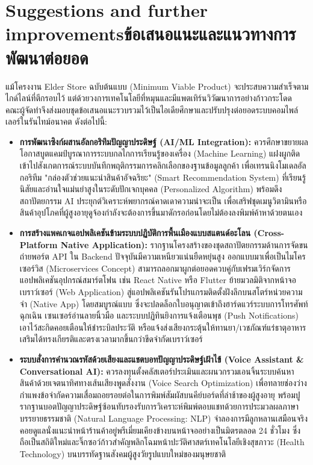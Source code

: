 \section{\ifenglish Suggestions and further improvements\else ข้อเสนอแนะและแนวทางการพัฒนาต่อยอด\fi}
แม้โครงงาน Elder Store ฉบับต้นแบบ (Minimum Viable Product) จะประสบความสำเร็จตามไกด์ไลน์ที่ตีกรอบไว้ แต่ด้วยวงการเทคโนโลยีที่หมุนและมีแพตเทิร์นวิวัฒนาการอย่างก้าวกระโดด คณะผู้จัดทำจึงส่งมอบชุดข้อเสนอแนะรวบรวมไว้เป็นไอเดียศึกษาและปรับปรุงต่อยอดระบบคอมไพล์เลอร์ในรันไทม์อนาคต ดังต่อไปนี้:

\begin{itemize}
  \item \textbf{การพัฒนาซิงก์ผสานอัลกอริทึมปัญญาประดิษฐ์ (AI/ML Integration):} 
  ควรศึกษาขยายผลโอกาสบูตแคมป์บูรณาการระบบกลไกการเรียนรู้ของเครื่อง (Machine Learning) แฝงผูกติดเข้าไปสังเกตการณ์ระบบบันทึกพฤติกรรมการคลิกเลือกของฐานข้อมูลลูกค้า เพื่อเทรนนิงโมเดลอัลกอริทึม "กล่องตัวช่วยแนะนำสินค้าอัจฉริยะ" (Smart Recommendation System) ที่เรียนรู้นิสัยและอ่านใจแม่นยำสูงในระดับปักเจกบุคคล (Personalized Algorithm) พร้อมดึงสถาปัตยกรรม AI ประยุกต์วิเคราะห์พยากรณ์คาดเดาความน่าจะเป็น เพื่อเสริฟชุดเมนูวิตามินหรือสินค้าอุปโภคที่ผู้สูงอายุดูจ้องกำลังจะต้องการขึ้นมาดักรอก่อนโดยไม่ต้องลงพิมพ์ค้าหาด้วยตนเอง

  \item \textbf{การสร้างแพคเกจแอปพลิเคชันข้ามระบบปฏิบัติการพื้นเมืองแบบสแตนด์อะโลน (Cross-Platform Native Application):} 
  รากฐานโครงสร้างของชุดสถาปัตยกรรมด้านการจัดขนถ่ายพอร์ต API ใน Backend ปัจจุบันมีความเหนียวแน่นยืดหยุ่นสูง ออกแบบมาเพื่อเป็นไมโครเซอร์วิส (Microservices Concept) สามารถลอกมาผูกต่อยอดควบคู่กับเฟรมเวิร์กจัดการแอปพลิเคชันอุปกรณ์สมาร์ตโฟน เช่น React Native หรือ Flutter ย้ายมวลมิติจากหน้าจอเบราว์เซอร์ (Web Application) สู่แอปพลิเคชันรันโปรแกรมติดตั้งฝังลึกบนสโตร์หน่วยความจำ (Native App) โดยสมบูรณ์แบบ ซึ่งจะปลดล็อกใบอนุญาตเข้าถึงฮาร์ดแวร์ระบบการโทรศัพท์ฉุกเฉิน เซนเซอร์อ่านลายนิ้วมือ และระบบปฏิทินยิงการแจ้งเตือนพุช (Push Notifications) เอาไว้สะกิดคอยเตือนให้ชำระบิลประวัติ หรือแจ้งส่งเสียงกระตุ้นให้ทานยา/เวชภัณฑ์แร่ธาตุอาหารเสริมได้ทรงเกียรติและตรงเวลามากขึ้นกว่าขีดจำกัดเบราว์เซอร์

  \item \textbf{ระบบสั่งการคำนวณรหัสด้วยเสียงและแชตบอทปัญญาประดิษฐ์เฝ้าไข้ (Voice Assistant \& Conversational AI):} 
  ควรลงทุนตั้งคลัสเตอร์ประเมินและผนวกรวมเอนจิ้นระบบค้นหาสินค้าด้วยเจตนาทิศทางเส้นเสียงพูดสั่งงาน (Voice Search Optimization) เพื่อทลายช่องว่างกำแพงข้อจำกัดความเสื่อมถอยรอยต่อในการพิมพ์สัมผัสบนคีย์บอร์ดที่ล่าช้าของผู้สูงอายุ \cite{uxdesign2023} พร้อมปูรากฐานบอตปัญญาประดิษฐ์ซ้อนทับรองรับการวิเคราะห์พิมพ์ตอบแชทด้วยการประมวลผลภาษาบรรยายธรรมชาติ (Natural Language Processing: NLP) จำลองการมีลูกหลานเสมือนจริงคอยดูแลนั่งแนะนำหน้าร้านค้าอยู่พรีเมี่ยมเคียงข้างบนหน้าจออย่างเป็นมิตรตลอด 24 ชั่วโมง ซึ่งถือเป็นสถิติใหม่และจิ๊กซอว์ก้าวสำคัญพลิกโฉมหน้าปะวัติศาสตร์เทคโนโลยีเชิงสุขภาวะ (Health Technology) บนบรรทัดฐานสังคมผู้สูงวัยรูปแบบใหม่ของมนุษยชาติ
\end{itemize}
